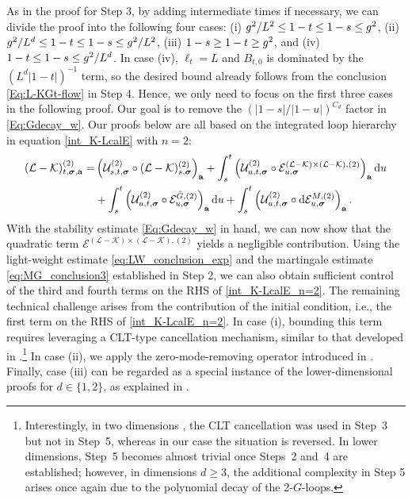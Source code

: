 As in the proof for Step 3, by adding intermediate times if necessary, we can divide the proof into the following four cases: (i) $g^2/L^{2}\le 1- t\le 1-s \le g^2$, (ii) $g^2/L^{d}\le 1-t\le 1-s\le g^2/L^{2}$, (iii) $1- s\ge 1-t \ge g^2$, and (iv) $1-t\le 1-s\le g^2/L^{d}$. 
In case (iv), $\ell_t=L$ and $B_{t,0}$ is dominated by the $(L^d|1-t|)^{-1}$ term, so the desired bound already follows from the conclusion \eqref{Eq:L-KGt-flow} in Step 4. Hence, we only need to focus on the first three cases in the following proof. Our goal is to remove the $(|1-s|/|1-u|)^{C_d}$ factor in \eqref{Eq:Gdecay_w}. 
Our proofs below are all based on the integrated loop hierarchy in equation \eqref{int_K-LcalE} with $n=2$:
\begin{align} \label{int_K-LcalE_n=2}
    (\mathcal{L} - \mathcal{K})^{(2)}_{t, {\boldsymbol{\sigma}}, {\mathbf{a}}}= &
    \left(\mathcal{U}^{(2)}_{s, t, {\boldsymbol{\sigma}}} \circ (\mathcal{L} - \mathcal{K})^{(2)}_{s, {\boldsymbol{\sigma}}}\right)_{{\mathbf{a}}}+ \int_{s}^t \left(\mathcal{U}^{(2)}_{u, t, {\boldsymbol{\sigma}}} \circ \mathcal{E}^{(\mathcal{L} - \mathcal{K}) \times (\mathcal{L} - \mathcal{K}),(2)}_{u, {\boldsymbol{\sigma}}}\right)_{{\mathbf{a}}} \mathrm{d} u  \nonumber \\
    &+ \int_{s}^t \left(\mathcal{U}^{(2)}_{u, t, {\boldsymbol{\sigma}}} \circ \mathcal{E}^{{\mathring G},(2)}_{u, {\boldsymbol{\sigma}}}\right)_{{\mathbf{a}}} \mathrm{d} u + \int_{s}^t \left(\mathcal{U}^{(2)}_{u, t, {\boldsymbol{\sigma}}} \circ \mathrm{d}\mathcal{E}^{M,(2)}_{u, {\boldsymbol{\sigma}}}\right)_{{\mathbf{a}}} . 
\end{align}
With the stability estimate \eqref{Eq:Gdecay_w} in hand, we can now show that the quadratic term $\mathcal{E}^{(\mathcal{L} - \mathcal{K}) \times (\mathcal{L} - \mathcal{K}),(2)}$ yields a negligible contribution. Using the light-weight estimate \eqref{eq:LW_conclusion_exp} and the martingale estimate \eqref{eq:MG_conclusion3} established in Step 2, we can also obtain sufficient control of the third and fourth terms on the RHS of \eqref{int_K-LcalE_n=2}.
The remaining technical challenge arises from the contribution of the initial condition, i.e., the first term on the RHS of \eqref{int_K-LcalE_n=2}.
In case (i), bounding this term requires leveraging a CLT-type cancellation mechanism, similar to that developed in \cite{DYYY25}.\footnote{Interestingly, in two dimensions \cite{DYYY25}, the CLT cancellation was used in Step~3 but not in Step~5, whereas in our case the situation is reversed. In lower dimensions, Step~5 becomes almost trivial once Steps~2 and~4 are established; however, in dimensions $d\ge 3$, the additional complexity in Step 5 arises once again due to the polynomial decay of the 2-$G$-loops.}
In case (ii), we apply the zero-mode-removing operator introduced in . Finally, case (iii) can be regarded as a special instance of the lower-dimensional proofs for $d\in \{1,2\}$, as explained in . %


